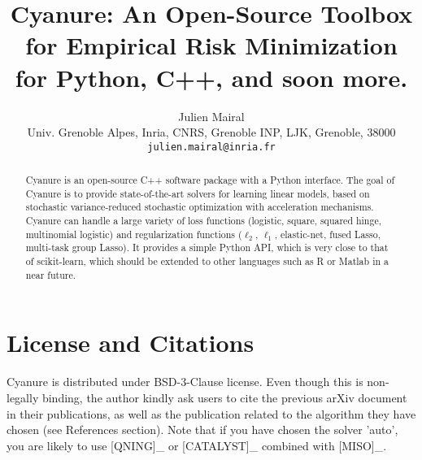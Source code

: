 \documentclass{article}
\title{Cyanure: An Open-Source Toolbox for Empirical Risk Minimization 
for Python, C++, and soon more.
}
\author{
Julien Mairal \\
   {Univ. Grenoble Alpes, Inria, CNRS, Grenoble INP, LJK, Grenoble, 38000}\\
         \texttt{julien.mairal@inria.fr}}
\begin{document}
\maketitle

\begin{abstract}
   Cyanure is an open-source C++ software package with a Python interface. 
   The goal of Cyanure is to provide state-of-the-art solvers for learning linear models,
   based on stochastic variance-reduced stochastic optimization with
   acceleration mechanisms.
   Cyanure can handle a large variety of loss functions (logistic, square,
   squared hinge, multinomial logistic) and regularization functions ($\ell_2$,
   $\ell_1$, elastic-net, fused Lasso, multi-task group Lasso).
   It provides a simple Python API, which is very close to that of scikit-learn,
   which should be extended to other languages such as R or Matlab in a near future.
\end{abstract}

\section{License and Citations}
Cyanure is distributed under BSD-3-Clause license. Even though this is non-legally binding, the author kindly ask users to cite the previous arXiv document in their publications, as well as the publication related to the algorithm they have chosen (see References section). 
Note that if you have chosen the solver 'auto', you are likely to use [QNING]_ or [CATALYST]_ combined with [MISO]_.
\end{document}
